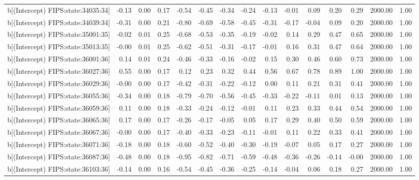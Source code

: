 \begin{table}[ht]
\begin{tabular}{rrrrrrrrrrrrrrr}
  b[(Intercept) FIPS:state:34035:34] & -0.13 & 0.00 & 0.17 & -0.54 & -0.45 & -0.34 & -0.24 & -0.13 & -0.01 & 0.09 & 0.20 & 0.29 & 2000.00 & 1.00 \\ 
  b[(Intercept) FIPS:state:34039:34] & -0.31 & 0.00 & 0.21 & -0.80 & -0.69 & -0.58 & -0.45 & -0.31 & -0.17 & -0.04 & 0.09 & 0.20 & 2000.00 & 1.00 \\ 
  b[(Intercept) FIPS:state:35001:35] & -0.02 & 0.01 & 0.25 & -0.68 & -0.53 & -0.35 & -0.19 & -0.02 & 0.14 & 0.29 & 0.47 & 0.65 & 2000.00 & 1.00 \\ 
  b[(Intercept) FIPS:state:35013:35] & -0.00 & 0.01 & 0.25 & -0.62 & -0.51 & -0.31 & -0.17 & -0.01 & 0.16 & 0.31 & 0.47 & 0.64 & 2000.00 & 1.00 \\ 
  b[(Intercept) FIPS:state:36001:36] & 0.14 & 0.01 & 0.24 & -0.46 & -0.33 & -0.16 & -0.02 & 0.15 & 0.30 & 0.46 & 0.60 & 0.73 & 2000.00 & 1.00 \\ 
  b[(Intercept) FIPS:state:36027:36] & 0.55 & 0.00 & 0.17 & 0.12 & 0.23 & 0.32 & 0.44 & 0.56 & 0.67 & 0.78 & 0.89 & 1.00 & 2000.00 & 1.00 \\ 
  b[(Intercept) FIPS:state:36029:36] & -0.00 & 0.00 & 0.17 & -0.42 & -0.31 & -0.22 & -0.12 & 0.00 & 0.11 & 0.21 & 0.31 & 0.41 & 2000.00 & 1.00 \\ 
  b[(Intercept) FIPS:state:36055:36] & -0.34 & 0.00 & 0.18 & -0.79 & -0.70 & -0.56 & -0.45 & -0.33 & -0.22 & -0.11 & 0.01 & 0.13 & 2000.00 & 1.00 \\ 
  b[(Intercept) FIPS:state:36059:36] & 0.11 & 0.00 & 0.18 & -0.33 & -0.24 & -0.12 & -0.01 & 0.11 & 0.23 & 0.33 & 0.44 & 0.54 & 2000.00 & 1.00 \\ 
  b[(Intercept) FIPS:state:36065:36] & 0.17 & 0.00 & 0.17 & -0.26 & -0.17 & -0.05 & 0.05 & 0.17 & 0.29 & 0.40 & 0.50 & 0.59 & 2000.00 & 1.00 \\ 
  b[(Intercept) FIPS:state:36067:36] & -0.00 & 0.00 & 0.17 & -0.40 & -0.33 & -0.23 & -0.11 & -0.01 & 0.11 & 0.22 & 0.33 & 0.41 & 2000.00 & 1.00 \\ 
  b[(Intercept) FIPS:state:36071:36] & -0.18 & 0.00 & 0.18 & -0.60 & -0.52 & -0.40 & -0.30 & -0.19 & -0.07 & 0.05 & 0.17 & 0.27 & 2000.00 & 1.00 \\ 
  b[(Intercept) FIPS:state:36087:36] & -0.48 & 0.00 & 0.18 & -0.95 & -0.82 & -0.71 & -0.59 & -0.48 & -0.36 & -0.26 & -0.14 & -0.00 & 2000.00 & 1.00 \\ 
  b[(Intercept) FIPS:state:36103:36] & -0.14 & 0.00 & 0.16 & -0.54 & -0.45 & -0.36 & -0.25 & -0.14 & -0.04 & 0.06 & 0.18 & 0.27 & 2000.00 & 1.00 \\ 

\end{tabular}
\end{table}
